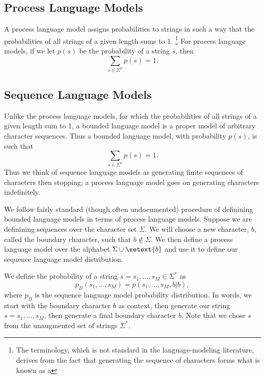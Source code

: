 \subsection{Process Language Models}

A process language model assigns probabilities to strings
in such a way that the probabilities of all strings of a given
length sums to 1.%
%
\footnote{The terminology, which is not standard in the
  language-modeling literature, derives from the fact that generating
  the sequence of characters forms what is known as a }
%
For process language models, if we let $p(s)$ be the probability of a
string $s$, then
%
\begin{equation}
\sum_{s \in \Sigma^n} p(s) = 1.
\end{equation}
%


\subsection{Sequence Language Models}

Unlike the process language models, for which the probabilities of all
strings of a given length sum to 1, a bounded language model is a
proper model of arbitrary character sequences.  Thus a bounded
language model, with probability $p(s)$, is such that
%
\begin{equation}
\sum_{s \in \Sigma^n} p(s) = 1.\label{eq:lm-seq-norm}
\end{equation}
%
Thus we think of sequence language models as generating finite
sequences of characters then stopping; a process language model
goes on generating characters indefinitely.

We follow fairly standard (though often undocumented) procedure of
definining bounded language models in terms of process language
models.  Suppose we are definining sequences over the character set
$\Sigma$.  We will choose a new character, $b$, called the boundary
character, such that $b \not\in \Sigma$.  We then define a process
language model over the alphabet $\Sigma \cup \setext{b}$ and use it
to define our sequence language model distribution.

We define the probability of a string $s = s_1,\ldots,s_M \in \Sigma^*$
as
%
\begin{equation}
p_B(s_1,\ldots,s_M) = p(s_1,\ldots,s_M,b|b),\label{eq:lm-seq-def}
\end{equation}
%
where $p_B$ is the sequence language model probability distribution.
In words, we start with the boundary character $b$ as context, then
generate our string $s = s_1,\ldots,s_M$, then generate a final
boundary character $b$.  Note that we chose $s$ from the unaugmented
set of strings  $\Sigma^*$.  

